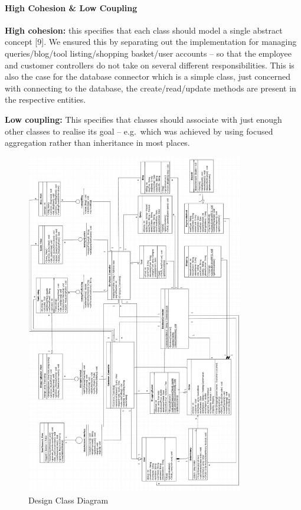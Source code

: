 \hypertarget{high-cohesion-low-coupling}{%
\paragraph{High Cohesion \& Low
Coupling}\label{high-cohesion-low-coupling}}

\textbf{High cohesion: } this specifies that each class should model a
single abstract concept {[}9{]}. We ensured this by separating out the
implementation for managing queries/blog/tool listing/shopping
basket/user accounts -- so that the employee and customer controllers do
not take on several different responsibilities. This is also the case
for the database connector which is a simple class, just concerned with
connecting to the database, the create/read/update methods are present
in the respective entities.

\textbf{Low coupling: }This specifies that classes should associate with
just enough other classes to realise its goal -- e.g.~which was achieved
by using focused aggregation rather than inheritance in most places.

\begin{figure}[H]
      \centering
      \includegraphics[trim = 0 0 0 0, clip, width=0.85\textwidth]{TempImg/Dclass.png}
      \caption{Design Class Diagram}
 \end{figure}


